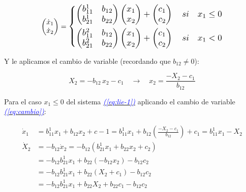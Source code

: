 \documentclass[12pt,a4paper]{report} %
\newcommand{\eref}[1]{\hyperref[#1]{\textcolor{blue}{\textit{(\ref*{#1})}}}}
\begin{document}
	\begin{equation}
		\begin{pmatrix*}[r]
			\dot{x}_1 \\ \dot{x}_2
		\end{pmatrix*}=
		\label{eq:lie-1}
		\scalebox{1.2}{$\displaystyle
			\left\{
			\begin{aligned}
				\begin{pmatrix*}[r]
					b_{11}^1 & b_{12} \\
					b_{21}^1 & b_{22}
				\end{pmatrix*}\begin{pmatrix*}[r]
				x_1\\x_2
				\end{pmatrix*}+\begin{pmatrix*}[r]
				c_1 \\ c_2
				\end{pmatrix*} \quad si \quad x_1 \leq 0 \\
				\begin{pmatrix*}[r]
					b_{11}^2 & b_{12} \\
					b_{21}^2 & b_{22}
				\end{pmatrix*}\begin{pmatrix*}[r]
				x_1\\x_2
				\end{pmatrix*}+\begin{pmatrix*}[r]
					c_1 \\ c_2
				\end{pmatrix*} \quad si \quad x_1 < 0
			\end{aligned}
			\right.
			$}
	\end{equation}\smallskip
	
	\vspace{0.5cm}\noindent Y le aplicamos el cambio de variable (recordando que $b_{12}\neq0$): 
	
	\begin{equation}
		\label{eq:cambio}
		X_2=-b_{12}\,x_2-c_1\quad \rightarrow \quad x_2=\frac{-X_2-c_1}{b_{12}}
	\end{equation}\smallskip

\newpage

	\noindent Para el caso $x_1\leq 0$ del sistema \eref{eq:lie-1} aplicando el cambio de variable \eref{eq:cambio}:
	
	\begin{equation}
		\label{eq:q1}
	\begin{aligned}
		\dot{x}_1&=b_{11}^1x_1+b_{12}x_2+c-1=b_{11}^1x_1+b_{12}\left(\frac{-X_2-c_1}{b_{12}}\right)+c_1=b_{11}^1x_1-X_2 \\[2mm]
		\dot{X}_2&=-b_{12}\dot{x}_2=-b_{12}\left(b_{21}^1x_1+b_{22}x_2+c_2\right) \\[2mm]
		&=-b_{12}b_{21}^1x_1+b_{22}\left(-b_{12}x_2\right)-b_{12}c_2  \\[2mm]
		&=-b_{12}b_{21}^1x_1+b_{22}\left(X_2+c_1\right)-b_{12}c_2 \\[2mm]
		&=-b_{12}b_{21}^1x_1+b_{22}X_2+b_{22}c_1-b_{12}c_2
	\end{aligned}
	\end{equation}\smallskip
	
\end{document}
